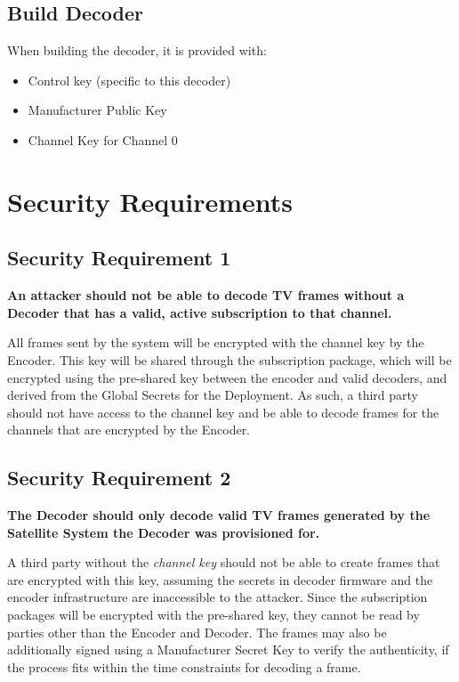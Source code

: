 \documentclass[12pt]{article}
\begin{document}
\subsection*{Build Decoder}
When building the decoder, it is provided with:
\begin{itemize}
  \item Control key (specific to this decoder)
  \item Manufacturer Public Key
  \item Channel Key for Channel 0
\end{itemize}

\vspace{1cm}

\section*{Security Requirements}

\subsection*{Security Requirement 1}
\textbf{An attacker should not be able to decode TV frames without a Decoder that has a valid, active subscription to that channel.}

All frames sent by the system will be encrypted with the channel key by the Encoder. This key will be shared through the subscription package, which will be encrypted using the pre-shared key between the encoder and valid decoders, and derived from the Global Secrets for the Deployment. As such, a third party should not have access to the channel key and be able to decode frames for the channels that are encrypted by the Encoder.

\subsection*{Security Requirement 2}
\textbf{The Decoder should only decode valid TV frames generated by the Satellite System the Decoder was provisioned for.}

A third party without the \textit{channel key} should not be able to create frames that are encrypted with this key, assuming the secrets in decoder firmware and the encoder infrastructure are inaccessible to the attacker. Since the subscription packages will be encrypted with the pre-shared key, they cannot be read by parties other than the Encoder and Decoder. The frames may also be additionally signed using a Manufacturer Secret Key to verify the authenticity, if the process fits within the time constraints for decoding a frame.
\end{document}
